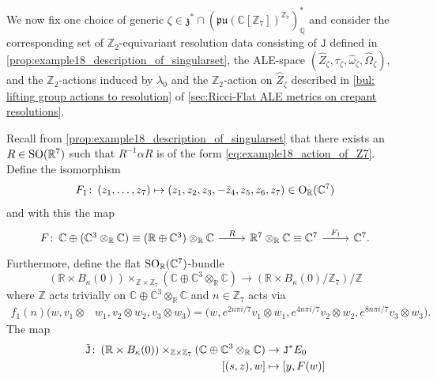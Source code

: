 \documentclass[11pt,a4paper]{scrartcl}
\newcommand{\col}{\colon \thinspace}
\newcommand{\SO}{\textup{SO}}
\renewcommand{\O}{\textup{O}}
\numberwithin{equation}{section}
\theoremstyle{plain}
\theoremstyle{definition}
\theoremstyle{remark}
\begin{document}
We now fix one choice of generic $\zeta \in \mathfrak{z}^*\cap (\mathfrak{pu}(\mathbb{C}[\mathbb{Z}_7])^{\mathbb{Z}_7})_\mathbb{Q}^*$ and consider the corresponding set of $\mathbb{Z}_2$-equivariant resolution data consisting of $\mathtt{J}$ defined in \autoref{prop:example18_description_of_singularset}, the ALE-space $(\hat{Z}_\zeta,\tau_\zeta,\hat{\omega}_\zeta,\hat{\Omega}_\zeta)$, and the $\mathbb{Z}_2$-actions induced by $\lambda_0$ and the $\mathbb{Z}_2$-action on $\hat{Z}_\zeta$ described in \autoref{bul: lifting group actions to resolution} of \autoref{sec:Ricci-Flat ALE metrics on crepant resolutions}.

\begin{proposition}\label{prop:Example18_bundle_around_singular_set}
Recall from \autoref{prop:example18_description_of_singularset} that there exists an $R\in \SO(\mathbb{R}^7)$ such that $R^{-1}\alpha R$ is of the form \eqref{eq:example18_action_of_Z7}. Define the isomorphism \[F_1 \col (z_1,\dots,z_7)\mapsto (z_1,z_2,z_3,-\bar{z}_4,z_5 , z_6 ,z_7) \in \O_{\mathbb{R}}(\mathbb{C}^7)\] and with this the map
\begin{equation*}
\begin{tikzcd}
F \col \mathbb{C}\oplus (\mathbb{C}^3\otimes_{\mathbb{R}} \mathbb{C}) \equiv (\mathbb{R}\oplus \mathbb{C}^3) \otimes_{\mathbb{R}} \mathbb{C} \arrow[r, "R"] & \mathbb{R}^7 \otimes_{\mathbb{R}} \mathbb{C} \equiv \mathbb{C}^7 \arrow[r, "F_1"] &  \mathbb{C}^7.
\end{tikzcd}
\end{equation*}
Furthermore, define the flat $\SO_\mathbb{R}(\mathbb{C}^7)$-bundle \[(\mathbb{R}\times B_\kappa(0)) \times_{\mathbb{Z}\times \mathbb{Z}_7} (\mathbb{C}\oplus \mathbb{C}^3 \otimes_\mathbb{R}\mathbb{C}) \to (\mathbb{R}\times B_\kappa(0)/\mathbb{Z}_7)/\mathbb{Z} \] where $\mathbb{Z}$ acts trivially on $\mathbb{C}\oplus \mathbb{C}^3\otimes_\mathbb{R}\mathbb{C}$ and $n\in \mathbb{Z}_7$ acts via 
\begin{align*}
f_1(n) \big(w,v_1\otimes &w_1,v_2\otimes w_2,v_3\otimes w_3\big) = \big(w,e^{2n\pi i/7}v_1 \otimes  w_1,e^{4n\pi i/7}v_2 \otimes w_2,e^{8n\pi i/7}v_3\otimes w_3\big).
\end{align*}
The map 
\begin{align*}
\tilde{\mathtt{J}} \col (\mathbb{R}\times B_\kappa(0)) \times_{\mathbb{Z}\times \mathbb{Z}_7} (\mathbb{C}\oplus \mathbb{C}^3 \otimes_\mathbb{R}\mathbb{C}) &\to \mathtt{J}^*E_0 \\
[(s,z),w] &\mapsto [y,F(w)]
\end{align*}

\end{proposition}
\end{document}
